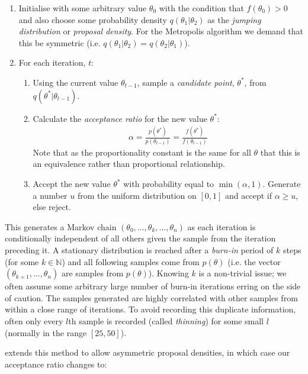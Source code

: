 \documentclass[11pt]{article} %
\begin{document}
\begin{enumerate}
 \item Initialise with some arbitrary value $\theta_0$ with the condition that $f(\theta_0) > 0$ and also choose some probability density $q(\theta_1|\theta_2)$ as the \emph{jumping distribution} or \emph{proposal density}. For the Metropolis algorithm we demand that this be symmetric (i.e. $q(\theta_1 | \theta_2) = q(\theta_2 | \theta_1)$).
 \item For each iteration, $t$:
 \begin{enumerate}
   \item Using the current value $\theta_{t-1}$, sample a \emph{candidate point}, $\theta^*$, from  $q(\theta^* | \theta_{t-1})$.
   \item Calculate the \emph{acceptance ratio} for the new value $\theta^*$:
    \begin{align}
    \alpha = \frac{p(\theta^*)}{p(\theta_{t-1})} = \frac{f(\theta^*)}{f(\theta_{t-1})}
    \end{align}
    Note that as the proportionality constant is the same for all $\theta$ that this is an equivalence rather than proportional relationship.
    \item Accept the new value $\theta^*$ with probability equal to $\min(\alpha, 1)$. Generate a number $u$ from the uniform distribution on $[0,1]$ and accept if $\alpha \geq u$, else reject.
  \end{enumerate}
\end{enumerate}
This generates a Markov chain $(\theta_0,\ldots,\theta_k,\ldots, \theta_n)$ as each iteration is conditionally independent of all others given the sample from the iteration preceding it. A stationary distribution is reached after a \emph{burn-in} period of $k$ steps (for some $k \in \mathbb{N}$) and all following samples come from $p(\theta)$ (i.e. the vector $(\theta_{k+1},\ldots,\theta_n)$ are samples from $p(\theta)$). Knowing $k$ is a non-trivial issue; we often assume some arbitrary large number of burn-in iterations erring on the side of caution. The samples generated are highly correlated with other samples from within a close range of iterations. To avoid recording this duplicate information, often only every $l$th sample is recorded (called \emph{thinning}) for some small $l$ (normally in the range $[25, 50]$).

\citet{HastingsMonteCarloSampling} extends this method to allow asymmetric proposal densities, in which case our acceptance ratio changes to:
\end{document}
